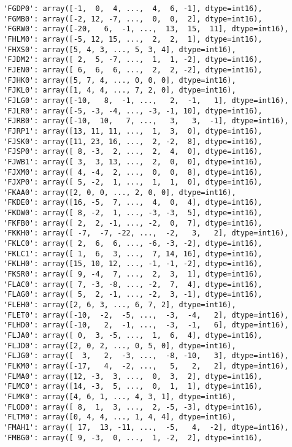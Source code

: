 \documentclass[11pt]{article}
\begin{document}
\begin{verbatim}
 'FGDP0': array([-1,  0,  4, ...,  4,  6, -1], dtype=int16),
 'FGMB0': array([-2, 12, -7, ...,  0,  0,  2], dtype=int16),
 'FGRW0': array([-20,   6,  -1, ...,  13,  15,  11], dtype=int16),
 'FHLM0': array([-5, 12, 15, ...,  2,  2,  1], dtype=int16),
 'FHXS0': array([5, 4, 3, ..., 5, 3, 4], dtype=int16),
 'FJDM2': array([ 2,  5, -7, ...,  1,  1, -2], dtype=int16),
 'FJEN0': array([ 6,  6,  6, ...,  2,  2, -2], dtype=int16),
 'FJHK0': array([5, 7, 4, ..., 0, 0, 0], dtype=int16),
 'FJKL0': array([1, 4, 4, ..., 7, 2, 0], dtype=int16),
 'FJLG0': array([-10,   8,  -1, ...,   2,  -1,   1], dtype=int16),
 'FJLR0': array([-5, -3, -4, ..., -3, -1, 10], dtype=int16),
 'FJRB0': array([-10,  10,   7, ...,   3,   3,  -1], dtype=int16),
 'FJRP1': array([13, 11, 11, ...,  1,  3,  0], dtype=int16),
 'FJSK0': array([11, 23, 16, ...,  2, -2,  8], dtype=int16),
 'FJSP0': array([ 8, -3,  2, ...,  2,  4,  0], dtype=int16),
 'FJWB1': array([ 3,  3, 13, ...,  2,  0,  0], dtype=int16),
 'FJXM0': array([ 4, -4,  2, ...,  0,  0,  8], dtype=int16),
 'FJXP0': array([ 5, -2,  1, ...,  1,  1,  0], dtype=int16),
 'FKAA0': array([2, 0, 0, ..., 2, 0, 0], dtype=int16),
 'FKDE0': array([16, -5,  7, ...,  4,  0,  4], dtype=int16),
 'FKDW0': array([ 8, -2,  1, ..., -3, -3,  5], dtype=int16),
 'FKFB0': array([ 2,  2, -1, ..., -2,  0,  7], dtype=int16),
 'FKKH0': array([ -7,  -7, -22, ...,  -2,   3,   2], dtype=int16),
 'FKLC0': array([ 2,  6,  6, ..., -6, -3, -2], dtype=int16),
 'FKLC1': array([ 1,  6,  3, ...,  7, 14, 16], dtype=int16),
 'FKLH0': array([15, 10, 12, ..., -1, -1, -2], dtype=int16),
 'FKSR0': array([ 9, -4,  7, ...,  2,  3,  1], dtype=int16),
 'FLAC0': array([ 7, -3, -8, ..., -2,  7,  4], dtype=int16),
 'FLAG0': array([ 5,  2, -1, ..., -2,  3, -1], dtype=int16),
 'FLEH0': array([2, 6, 3, ..., 6, 7, 2], dtype=int16),
 'FLET0': array([-10,  -2,  -5, ...,  -3,  -4,   2], dtype=int16),
 'FLHD0': array([-10,   2,  -1, ...,  -3,  -1,   6], dtype=int16),
 'FLJA0': array([ 0,  3, -5, ...,  1,  6,  4], dtype=int16),
 'FLJD0': array([2, 0, 2, ..., 0, 5, 0], dtype=int16),
 'FLJG0': array([  3,   2,  -3, ...,  -8, -10,   3], dtype=int16),
 'FLKM0': array([-17,   4,  -2, ...,   5,   2,   2], dtype=int16),
 'FLMA0': array([12, -3,  3, ...,  0,  3,  2], dtype=int16),
 'FLMC0': array([14, -3,  5, ...,  0,  1,  1], dtype=int16),
 'FLMK0': array([4, 6, 1, ..., 4, 3, 1], dtype=int16),
 'FLOD0': array([ 8,  1,  3, ...,  2, -5, -3], dtype=int16),
 'FLTM0': array([0, 4, 4, ..., 1, 4, 4], dtype=int16),
 'FMAH1': array([ 17,  13, -11, ...,  -5,   4,  -2], dtype=int16),
 'FMBG0': array([ 9, -3,  0, ...,  1, -2,  2], dtype=int16),

\end{verbatim}
\end{document}
